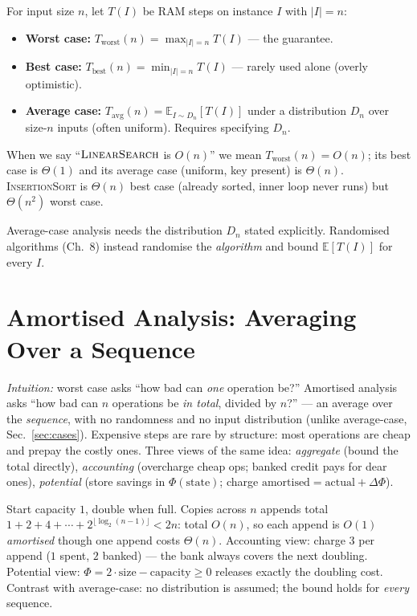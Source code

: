 For input size $n$, let $T(I)$ be RAM steps on instance $I$ with $|I|=n$:
\begin{itemize}
    \item \textbf{Worst case:} $T_{\text{worst}}(n)=\max_{|I|=n}T(I)$ --- the guarantee.
    \item \textbf{Best case:} $T_{\text{best}}(n)=\min_{|I|=n}T(I)$ --- rarely used alone (overly optimistic).
    \item \textbf{Average case:} $T_{\text{avg}}(n)=\mathbb{E}_{I\sim D_{n}}[T(I)]$ under a distribution $D_{n}$ over size-$n$ inputs (often uniform). Requires specifying $D_{n}$.
\end{itemize}
When we say ``$\textsc{LinearSearch}$ is $O(n)$'' we mean $T_{\text{worst}}(n)=O(n)$; its best case is $\Theta(1)$ and its average case (uniform, key present) is $\Theta(n)$. \textsc{InsertionSort} is $\Theta(n)$ best case (already sorted, inner loop never runs) but $\Theta(n^{2})$ worst case.

Average-case analysis needs the distribution $D_{n}$ stated explicitly. Randomised algorithms (Ch.~8) instead randomise the \emph{algorithm} and bound $\mathbb{E}[T(I)]$ for every $I$.

\section{Amortised Analysis: Averaging Over a Sequence}
\label{sec:amortised}
\emph{Intuition:} worst case asks ``how bad can \emph{one} operation be?'' Amortised analysis asks ``how bad can $n$ operations be \emph{in total}, divided by $n$?'' --- an average over the \emph{sequence}, with no randomness and no input distribution (unlike average-case, Sec.~\ref{sec:cases}). Expensive steps are rare by structure: most operations are cheap and prepay the costly ones. Three views of the same idea: \emph{aggregate} (bound the total directly), \emph{accounting} (overcharge cheap ops; banked credit pays for dear ones), \emph{potential} (store savings in $\Phi(\text{state})$; charge $\text{amortised}=\text{actual}+\Delta\Phi$).
\begin{example} Start capacity $1$, double when full. Copies across $n$ appends total $1+2+4+\cdots+2^{\lfloor\log_2(n-1)\rfloor}<2n$: total $O(n)$, so each append is $O(1)$ \emph{amortised} though one append costs $\Theta(n)$. Accounting view: charge $3$ per append ($1$ spent, $2$ banked) --- the bank always covers the next doubling. Potential view: $\Phi=2\cdot\text{size}-\text{capacity}\ge0$ releases exactly the doubling cost. Contrast with average-case: no distribution is assumed; the bound holds for \emph{every} sequence.
\end{example}

